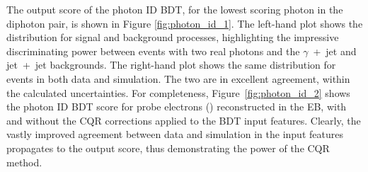 The output score of the photon ID BDT, for the lowest scoring photon in the diphoton pair, is shown in Figure \ref{fig:photon_id_1}. The left-hand plot shows the distribution for signal and background processes, highlighting the impressive discriminating power between events with two real photons and the $\gamma$~+~jet and jet~+~jet backgrounds. The right-hand plot shows the same distribution for \Zee events in both data and simulation. The two are in excellent agreement, within the calculated uncertainties. For completeness, Figure~\ref{fig:photon_id_2} shows the photon ID BDT score for probe electrons (\Zee) reconstructed in the EB, with and without the CQR corrections applied to the BDT input features. Clearly, the vastly improved agreement between data and simulation in the input features propagates to the output score, thus demonstrating the power of the CQR method.


